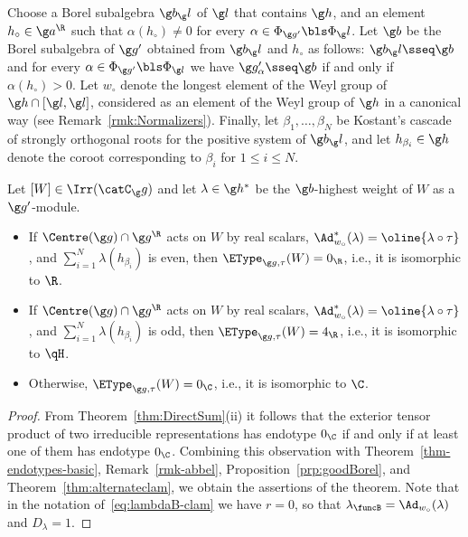 \documentclass[12pt]{amsart}
\begin{document}
Choose a Borel subalgebra $\g b_\g l$ of $\g l$ that contains $\g h$, and 
an element $h_\circ\in\g a^\R$ such that $\alpha(h_\circ)\neq 0$ for every $\alpha\in\Phi_{\g g'}\bls \Phi_\g l$. Let $\g b$ be the Borel subalgebra of $\g g'$ obtained from $\g b_\g l$ and $h_\circ$ as follows:   $\g b_\g l\sseq \g b$ and for every $\alpha\in\Phi_{\g g'}\bls \Phi_{\g l}$ we have 
$
\g g'_\alpha\sseq \g b$ if and only if $\alpha(h_\circ)>0$.
 Let $w_\circ$ denote the longest element of the Weyl group of $\g h\cap [\g l,\g l]$, considered as an element of the Weyl group of $\g h$ in a canonical way (see Remark~\ref{rmk:Normalizers}). Finally, let $\beta_1,\ldots,\beta_N$ be Kostant's cascade of strongly orthogonal roots for the positive system of $\g b_\g l$, and let $h_{\beta_i}\in\g h$ denote the coroot corresponding to $\beta_i$ for $1\leq i\leq N$. 

\begin{thm}
\label{thm-reductivespecial}
Let $[W]\in\Irr(\catC_\g g)$ and let $\lambda\in\g h^*$ be the $\g b$-highest weight of $W$ as a $\g g'$-module.
\begin{itemize}
\item[\rm(i)] If $\Centre(\g g)\cap\g g^\R$ acts on $W$ by real scalars, $\Ad^*_{w_\circ}(\lambda)=\oline{\lambda\circ\tau}$, and $\sum_{i=1}^N\lambda(h_{\beta_i})$ is even, then $\EType_{\g g,\tau}(W)=0_\R$, i.e., it is isomorphic to $\R$. 


\item[\rm(ii)] If $\Centre(\g g)\cap\g g^\R$ acts on $W$ by real scalars, $\Ad^*_{w_\circ}(\lambda)=\oline{\lambda\circ\tau}$, and $\sum_{i=1}^N\lambda(h_{\beta_i})$ is odd, then $\EType_{\g g,\tau}(W)=4_\R$, i.e., it is isomorphic to $\qH$.

\item[\rm(iii)] Otherwise, $\EType_{\g g,\tau}(W)=0_\C$, i.e., it is isomorphic to $\C$. 

\end{itemize} 
\end{thm}
\begin{proof}
From Theorem~\ref{thm:DirectSum}(ii) it follows that the exterior tensor product of two irreducible representations has endotype $0_\C$ if and only if at least one of them has endotype $0_\C$. Combining this  observation with Theorem~\ref{thm-endotypes-basic}, Remark~\ref{rmk-abbel}, Proposition~\ref{prp:goodBorel}, and Theorem~\ref{thm:alternateclam}, we obtain the assertions of the theorem. Note that in the notation of~\eqref{eq:lambdaB-clam} we have $r=0$, so that $\lambda_\funcB=\Ad_{w_\circ}(\lambda)$ and $D_\lambda=1$. 
\end{proof}
\end{document}
